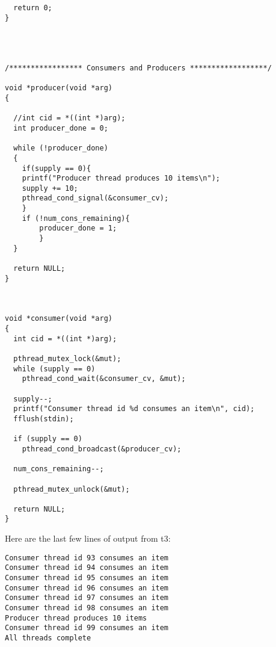 \documentclass[11pt]{report}
\begin{document}
\begin{lstlisting}
  return 0;
}




/***************** Consumers and Producers ******************/

void *producer(void *arg)
{

  //int cid = *((int *)arg);
  int producer_done = 0;
  
  while (!producer_done)
  {
  	if(supply == 0){
  	printf("Producer thread produces 10 items\n");
    supply += 10;
    pthread_cond_signal(&consumer_cv);
    }
    if (!num_cons_remaining){
    	producer_done = 1;
    	}
  }

  return NULL;
}



void *consumer(void *arg)
{
  int cid = *((int *)arg);

  pthread_mutex_lock(&mut);
  while (supply == 0)
    pthread_cond_wait(&consumer_cv, &mut);

  supply--;
  printf("Consumer thread id %d consumes an item\n", cid);
  fflush(stdin);

  if (supply == 0)
    pthread_cond_broadcast(&producer_cv);

  num_cons_remaining--;

  pthread_mutex_unlock(&mut);

  return NULL;
}
\end{lstlisting}

Here are the last few lines of output from t3:


\begin{verbatim}
Consumer thread id 93 consumes an item
Consumer thread id 94 consumes an item
Consumer thread id 95 consumes an item
Consumer thread id 96 consumes an item
Consumer thread id 97 consumes an item
Consumer thread id 98 consumes an item
Producer thread produces 10 items
Consumer thread id 99 consumes an item
All threads complete
\end{verbatim}
\end{document}
